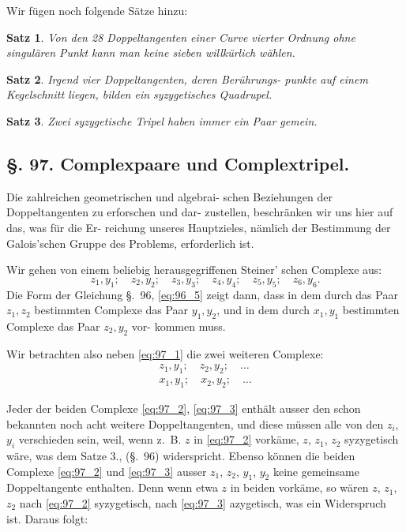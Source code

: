 \documentclass[12pt,a4paper]{article}
\theoremstyle{plain}
\newtheorem{satz}{Satz}[section]
\theoremstyle{definition}
\theoremstyle{remark}
\begin{document}
Wir fügen noch folgende Sätze hinzu:

\begin{satz}
Von den 28 Doppeltangenten einer Curve vierter
Ordnung ohne singulären Punkt kann man keine
sieben willkürlich wählen.
\end{satz}

\begin{satz}
Irgend vier Doppeltangenten, deren Berührungs-
punkte auf einem Kegelschnitt liegen, bilden ein
syzygetisches Quadrupel.
\end{satz}

\begin{satz}
Zwei syzygetische Tripel haben immer ein Paar
gemein.
\end{satz}

\subsection*{§. 97. Complexpaare und Complextripel.}

Die zahlreichen geometrischen und algebrai-
schen Beziehungen der Doppeltangenten zu erforschen und dar-
zustellen, beschränken wir uns hier auf das, was für die Er-
reichung unseres Hauptzieles, nämlich der Bestimmung der
Galois'schen Gruppe des Problems, erforderlich ist.

Wir gehen von einem beliebig herausgegriffenen Steiner'
schen Complexe aus:
\begin{equation}\label{eq:97_1}
z_1, y_1; \quad z_2, y_2; \quad z_3, y_3; \quad z_4, y_4; \quad z_5, y_5; \quad z_6, y_6.
\end{equation}
Die Form der Gleichung \S.~96, \eqref{eq:96_5} zeigt dann, dass in dem
durch das Paar $z_1, z_2$ bestimmten Complexe das Paar $y_1, y_2$, und
in dem durch $x_1, y_1$ bestimmten Complexe das Paar $z_2, y_2$ vor-
kommen muss.

Wir betrachten also neben \eqref{eq:97_1} die zwei weiteren Complexe:
\begin{align}
z_1, y_1; \quad z_2, y_2; \quad \ldots \label{eq:97_2} \\
x_1, y_1; \quad x_2, y_2; \quad \ldots \label{eq:97_3}
\end{align}

Jeder der beiden Complexe \eqref{eq:97_2}, \eqref{eq:97_3} enthält ausser den schon
bekannten noch acht weitere Doppeltangenten, und diese müssen
alle von den $z_i$, $y_i$ verschieden sein, weil, wenn z.~B. $z$ in \eqref{eq:97_2}
vorkäme, $z$, $z_1$, $z_2$ syzygetisch wäre, was dem Satze 3., (\S.~96)
widerspricht. Ebenso können die beiden Complexe \eqref{eq:97_2} und \eqref{eq:97_3}
ausser $z_1$, $z_2$, $y_1$, $y_2$ keine gemeinsame Doppeltangente enthalten.
Denn wenn etwa $z$ in beiden vorkäme, so wären $z$, $z_1$, $z_2$ nach
\eqref{eq:97_2} syzygetisch, nach \eqref{eq:97_3} azygetisch, was ein Widerspruch ist.
Daraus folgt:
\end{document}
